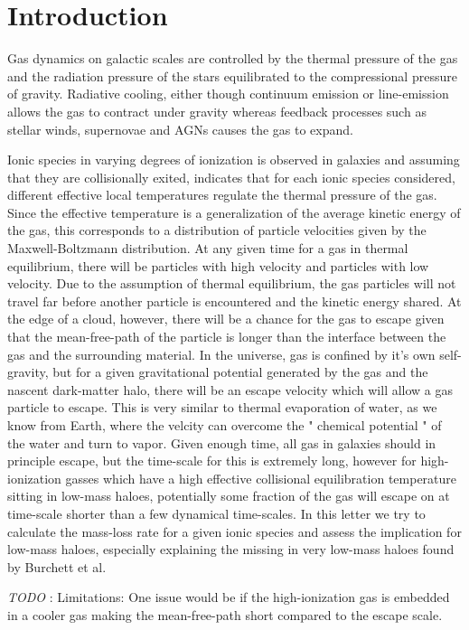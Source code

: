 \documentclass[a4paper,fleqn,usenatbib]{mnras}
\newcommand{\todo}[3]{{\color{#2}\emph{#1}: #3}}
\newcommand{\jtodo}[1]{\todo{TODO }{red}{#1}}
\begin{document}
\section{Introduction}

Gas dynamics on galactic scales are controlled by the thermal pressure of the gas and the radiation pressure of the stars equilibrated to the compressional pressure of gravity. Radiative cooling, either though continuum emission or line-emission allows the gas to contract under gravity whereas feedback processes such as stellar winds, supernovae and AGNs causes the gas to expand. 

Ionic species in varying degrees of ionization is observed in galaxies and assuming that they are collisionally exited, indicates that for each ionic species considered, different effective local temperatures regulate the thermal pressure of the gas. Since the effective temperature is a generalization of the average kinetic energy of the gas, this corresponds to a distribution of particle velocities given by the Maxwell-Boltzmann distribution. At any given time for a gas in thermal equilibrium, there will be particles with high velocity and particles with low velocity. Due to the assumption of thermal equilibrium, the gas particles will not travel far before another particle is encountered and the kinetic energy shared. At the edge of a cloud, however, there will be a chance for the gas to escape given that the mean-free-path of the particle is longer than the interface between the gas and the surrounding material. In the universe, gas is confined by it's own self-gravity, but for a given gravitational potential generated by the gas and the nascent dark-matter halo, there will be an escape velocity which will allow a gas particle to escape. This is very similar to thermal evaporation of water, as we know from Earth, where the velcity can overcome the " chemical potential " of the water and turn to vapor. Given enough time, all gas in galaxies should in principle escape, but the time-scale for this is extremely long, however for high-ionization gasses which have a high effective collisional equilibration temperature sitting in low-mass haloes, potentially some fraction of the gas will escape on at time-scale shorter than a few dynamical time-scales. 
In this letter we try to calculate the mass-loss rate for a given ionic species and assess the implication for low-mass haloes, especially explaining the missing  in very low-mass haloes found by Burchett et al.  

\jtodo{Limitations: One issue would be if the high-ionization gas is embedded in a cooler gas making the mean-free-path short compared to the escape scale.} 
\end{document}
